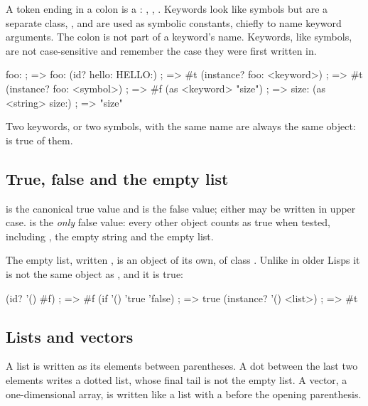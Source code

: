 A token ending in a colon is a : , ,
. Keywords look like symbols but are a separate class,
, and are used as
symbolic constants, chiefly to name keyword arguments. The colon is not
part of a keyword's name. Keywords, like symbols, are not case-sensitive and
remember the case they were first written in.

\begin{dylan}
foo:                         ; => foo:
(id? hello: HELLO:)          ; => #t
(instance? foo: <keyword>)   ; => #t
(instance? foo: <symbol>)    ; => #f
(as <keyword> "size")        ; => size:
(as <string> size:)          ; => "size"
\end{dylan}

\noindent Two keywords, or two symbols, with the same name are always the
same object:  is true of them.

\subsection{True, false and the empty list}\label{sec:syntax-booleans}

 is the canonical true value and
 is the false value; either may be written in
upper case.  is the \emph{only} false value: every other object
counts as true when tested, including , the empty string and the
empty list.

The empty list, written \code{()}, is an object of its own, of class
. Unlike in older Lisps it is not the same object as
, and it is true:

\begin{dylan}
(id? '() #f)                    ; => #f
(if '() 'true 'false)           ; => true
(instance? '() <list>)          ; => #t
\end{dylan}

\subsection{Lists and vectors}\label{sec:syntax-lists}

A list is written as its elements between parentheses. A dot between the
last two elements writes a dotted list, whose final tail is not the empty
list. A vector, a one-dimensional array, is written like a list with a
\code{\#} before the opening parenthesis.


